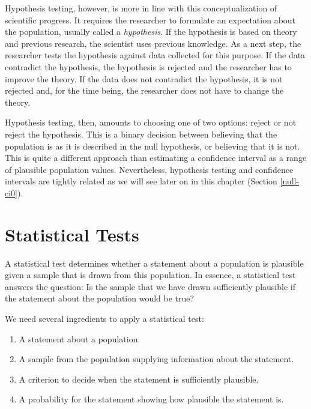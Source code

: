 \documentclass[a4paper]{book}
\theoremstyle{definition}
\theoremstyle{definition}
\theoremstyle{definition}
\theoremstyle{remark}
\begin{document}
Hypothesis testing, however, is more in line with this conceptualization
of scientific progress. It requires the researcher to formulate an
expectation about the population, usually called a \emph{hypothesis}. If
the hypothesis is based on theory and previous research, the scientist
uses previous knowledge. As a next step, the researcher tests the
hypothesis against data collected for this purpose. If the data
contradict the hypothesis, the hypothesis is rejected and the researcher
has to improve the theory. If the data does not contradict the
hypothesis, it is not rejected and, for the time being, the researcher
does not have to change the theory.

Hypothesis testing, then, amounts to choosing one of two options: reject
or not reject the hypothesis. This is a binary decision between
believing that the population is as it is described in the null
hypothesis, or believing that it is not. This is quite a different
approach than estimating a confidence interval as a range of plausible
population values. Nevertheless, hypothesis testing and confidence
intervals are tightly related as we will see later on in this chapter
(Section \ref{null-ci0}).

\section{Statistical Tests}\label{statistical-tests}

A statistical test determines whether a statement about a population is
plausible given a sample that is drawn from this population. In essence,
a statistical test answers the question: Is the sample that we have
drawn sufficiently plausible if the statement about the population would
be true?

We need several ingredients to apply a statistical test:

\begin{enumerate}
\def\labelenumi{\arabic{enumi}.}
\item
  A statement about a population.
\item
  A sample from the population supplying information about the
  statement.
\item
  A criterion to decide when the statement is sufficiently plausible.
\item
  A probability for the statement showing how plausible the statement
  is.
\end{enumerate}
\end{document}
